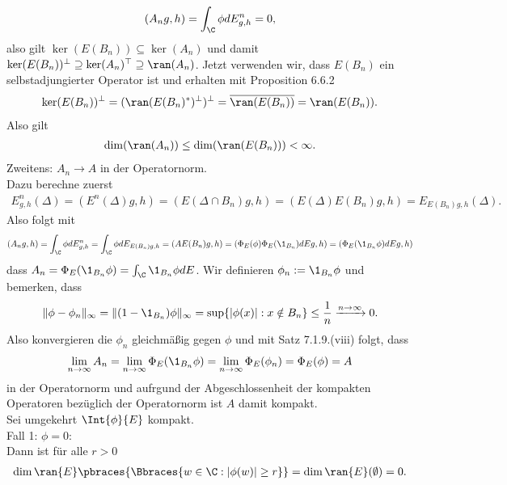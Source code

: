\begin{solution}
\begin{align*}
  (A_ng,h) = \int_{\C}\phi dE_{g,h}^n = 0,
\end{align*}
also gilt $\ker(E(B_n)) \subseteq \ker(A_n)$ und damit
$\ker(E(B_n))^{\bot} \supseteq \ker(A_n)^{\top} \supseteq \ran(A_n)$.
Jetzt verwenden wir, dass $E(B_n)$ ein selbstadjungierter
Operator ist und erhalten mit Proposition 6.6.2
\begin{align*}
  \ker(E(B_n))^{\bot} = (\ran(E(B_n)^*)^{\bot})^{\bot} = \overline{\ran(E(B_n))}
  = \ran(E(B_n)).
\end{align*}
Also gilt
\begin{align*}
  \dim(\ran(A_n)) \leq \dim(\ran(E(B_n))) < \infty.
\end{align*}
Zweitens: $A_n \to A$ in der Operatornorm. \\
Dazu berechne zuerst
\begin{align*}
  E_{g,h}^n(\Delta) = (E^n(\Delta)g,h) = (E(\Delta \cap B_n)g,h) = (E(\Delta)E(B_n)g,h)
  = E_{E(B_n)g,h}(\Delta).
\end{align*}
Also folgt mit
\begin{align*}
    (A_ng,h) = \int_{\C}\phi dE_{g,h}^n = \int_{\C}\phi dE_{E(B_n)g,h} = (AE(B_n)g,h)
    = (\Phi_E(\phi)\Phi_E(\1_{B_n}) dE g,h) = (\Phi_E(\1_{B_n}\phi) dE g,h)
\end{align*}
dass $A_n = \Phi_E(\1_{B_n}\phi) = \int_{\C} \1_{B_n}\phi dE$.
Wir definieren $\phi_n := \1_{B_n}\phi$ und bemerken, dass
\begin{align*}
  \|\phi - \phi_n\|_{\infty} = \|(1 - \1_{B_n})\phi\|_{\infty} = \sup\{|\phi(x)|: x \notin B_n\}
  \leq \frac{1}{n} \xrightarrow{n \to \infty} 0.
\end{align*}
Also konvergieren die $\phi_n$ gleichmäßig gegen $\phi$ und mit Satz 7.1.9.(viii)
folgt, dass
\begin{align*}
  \lim_{n \to \infty} A_n = \lim_{n \to \infty}\Phi_E(\1_{B_n}\phi) =
  \lim_{n \to \infty}\Phi_E(\phi_n) = \Phi_E(\phi) = A
\end{align*}
in der Operatornorm und aufrgund der Abgeschlossenheit der kompakten Operatoren
bezüglich der Operatornorm ist $A$ damit kompakt. \\
Sei umgekehrt $\Int{\phi}{E}$ kompakt. \\
Fall 1: $\phi = 0$: \\
Dann ist für alle $r > 0$
\begin{align*}
  \dim{\ran{E}}\pbraces{\Bbraces{w \in \C:|\phi(w)| \geq r}}
  = \dim{\ran{E}}(\emptyset) = 0.
\end{align*}

\end{solution}
